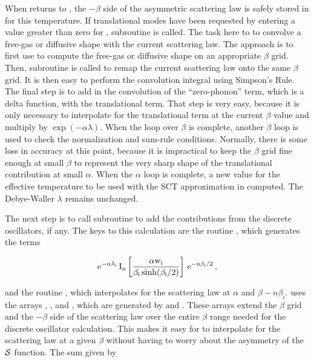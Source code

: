 When  returns to , the $-\beta$ side of the
asymmetric scattering law is safely stored in  for this
temperature.  If translational modes have been requested by entering
a value greater than zero for , subroutine
 is
called.  The task here to to convolve a free-gas or diffusive shape with
the current scattering law.  The approach is to first use
to compute the free-gas or diffusive shape on an appropriate $\beta$
grid.  Then, subroutine
 is called to remap the current
scattering law onto the same $\beta$ grid.  It is then easy to perform
the convolution integral using Simpson's Rule.  The final step is
to add in the convolution of the ``zero-phonon'' term, which is a delta
function, with the translational term.  That step is very easy, because
it is only necessary to interpolate for the translational term at the
current $\beta$ value and multiply by $\exp(-\alpha\lambda)$.  When the
loop over $\beta$ is complete, another $\beta$ loop is used to check
the normalization and sum-rule conditions.  Normally, there is some
loss in accuracy at this point, because it is impractical to keep
the $\beta$ grid fine enough at small $\beta$ to represent the very
sharp shape of the translational contribution at small $\alpha$.
When the $\alpha$ loop is complete, a new value for the effective
temperature to be used with the SCT approximation in computed.
The Debye-Waller $\lambda$ remains unchanged.

The next step is to call subroutine
 to add the
contributions from the discrete oscillators, if any.  The keys
to this calculation are the routine
, which generates the terms

\begin{equation}
   \rm e^{-\alpha\lambda_i}\,I_n\left[\frac{\alpha w_i}
     {\beta_i \sinh(\beta_i/2)}\right]\,\rm e^{-n\beta_i/2}\,,
\end{equation}
\vspace{0.5 pt}

\noindent
and the routine , which
interpolates for the scattering law
at $\alpha$ and $\beta{-}n\beta_i$.   uses the arrays
, , and , which are generated
by 
and .
These arrays extend the $\beta$ grid
and the $-\beta$ side of the scattering law over the entire $\beta$ range
needed for the discrete oscillator calculation.  This makes it easy for
 to interpolate for the scattering law at a given $\beta$
without having to worry about the asymmetry of the ${\cal S}$ function.
The sum given by

